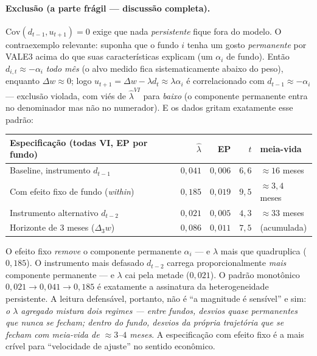 \documentclass[11pt,a4paper]{article}
\begin{document}
\paragraph{Exclusão (a parte frágil --- discussão completa).} $\mathrm{Cov}(d_{t-1},u_{t+1})=0$
exige que nada \emph{persistente} fique fora do modelo. O contraexemplo relevante: suponha que o
fundo $i$ tenha um gosto \emph{permanente} por VALE3 acima do que suas características explicam
(um $\alpha_i$ de fundo). Então $d_{i,t}\approx-\alpha_i$ \emph{todo mês} (o alvo medido fica
sistematicamente abaixo do peso), enquanto $\Delta w\approx0$; logo $u_{t+1}=\Delta w - \lambda
d_t \approx \lambda\alpha_i$ é correlacionado com $d_{t-1}\approx-\alpha_i$ --- exclusão violada,
com viés de $\widehat\lambda^{VI}$ para \emph{baixo} (o componente permanente entra no denominador
mas não no numerador). E os dados gritam exatamente esse padrão:

\begin{center}\small
\begin{tabular}{@{}lrrrl@{}}
\toprule
Especificação (todas VI, EP por fundo) & $\widehat\lambda$ & EP & $t$ & meia-vida \\
\midrule
Baseline, instrumento $d_{t-1}$ & $0{,}041$ & $0{,}006$ & $6{,}6$ & $\approx16$ meses \\
Com efeito fixo de fundo (\emph{within}) & $0{,}185$ & $0{,}019$ & $9{,}5$ & $\approx3{,}4$ meses \\
Instrumento alternativo $d_{t-2}$ & $0{,}021$ & $0{,}005$ & $4{,}3$ & $\approx33$ meses \\
Horizonte de 3 meses ($\Delta_3 w$) & $0{,}086$ & $0{,}011$ & $7{,}5$ & (acumulada) \\
\bottomrule
\end{tabular}
\end{center}

O efeito fixo \emph{remove} o componente permanente $\alpha_i$ --- e $\lambda$ mais que
quadruplica ($0{,}185$). O instrumento mais defasado $d_{t-2}$ carrega proporcionalmente
\emph{mais} componente permanente --- e $\lambda$ cai pela metade ($0{,}021$). O padrão monotônico
$0{,}021 \to 0{,}041 \to 0{,}185$ é exatamente a assinatura da heterogeneidade persistente. A
leitura defensável, portanto, não é ``a magnitude é sensível'' e sim: \emph{o $\lambda$ agregado
mistura dois regimes --- entre fundos, desvios quase permanentes que nunca se fecham; dentro do
fundo, desvios da própria trajetória que se fecham com meia-vida de $\approx3$--$4$ meses}. A
especificação com efeito fixo é a mais crível para ``velocidade de ajuste'' no sentido econômico.
\end{document}
